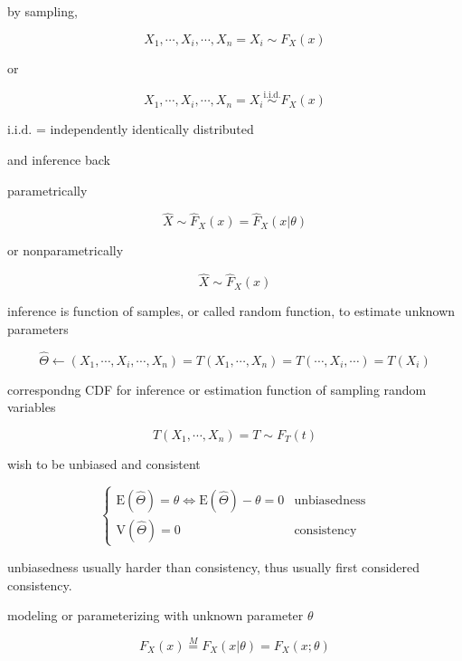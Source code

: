 \documentclass[
]{book}
\theoremstyle{definition}
\theoremstyle{definition}
\theoremstyle{definition}
\theoremstyle{definition}
\theoremstyle{remark}
\begin{document}
by sampling,

\[
X_{{\scriptscriptstyle 1}},\cdots,X_{{\scriptscriptstyle i}},\cdots,X_{{\scriptscriptstyle n}}=X_{{\scriptscriptstyle i}}\sim F_{{\scriptscriptstyle X}}\left(x\right)
\]

or

\[
X_{{\scriptscriptstyle 1}},\cdots,X_{{\scriptscriptstyle i}},\cdots,X_{{\scriptscriptstyle n}}=X_{{\scriptscriptstyle i}}\overset{\text{i.i.d.}}{\sim}F_{{\scriptscriptstyle X}}\left(x\right)
\]

\(\text{i.i.d.}\) = independently identically distributed

and inference back

parametrically

\[
\widehat{X}\sim\widehat{F}_{{\scriptscriptstyle X}}\left(x\right)=\widehat{F}_{{\scriptscriptstyle X}}\left(x|\theta\right)
\]

or nonparametrically

\[
\hat{X}\sim\hat{F}_{{\scriptscriptstyle X}}\left(x\right)
\]

inference is function of samples, or called random function, to estimate unknown parameters

\[
\widehat{\Theta}\leftarrow\left(X_{{\scriptscriptstyle 1}},\cdots,X_{{\scriptscriptstyle i}},\cdots,X_{{\scriptscriptstyle n}}\right)=T\left(X_{{\scriptscriptstyle 1}},\cdots,X_{{\scriptscriptstyle n}}\right)=T\left(\cdots,X_{{\scriptscriptstyle i}},\cdots\right)=T\left(X_{{\scriptscriptstyle i}}\right)
\]

correspondng CDF for inference or estimation function of sampling random variables

\[
T\left(X_{{\scriptscriptstyle 1}},\cdots,X_{{\scriptscriptstyle n}}\right)=T\sim F_{{\scriptscriptstyle T}}\left(t\right)
\]

wish to be unbiased and consistent

\[
\begin{cases}
\mathrm{E}\left(\widehat{\Theta}\right)=\theta\Leftrightarrow\mathrm{E}\left(\widehat{\Theta}\right)-\theta=0 & \text{unbiasedness}\\
\mathrm{V}\left(\widehat{\Theta}\right)=0 & \text{consistency}
\end{cases}
\]

unbiasedness usually harder than consistency, thus usually first considered consistency.

modeling or parameterizing with unknown parameter \(\theta\)

\[
F_{{\scriptscriptstyle X}}\left(x\right)\overset{M}{=}F_{{\scriptscriptstyle X}}\left(x|\theta\right)=F_{{\scriptscriptstyle X}}\left(x;\theta\right)
\]
\end{document}
